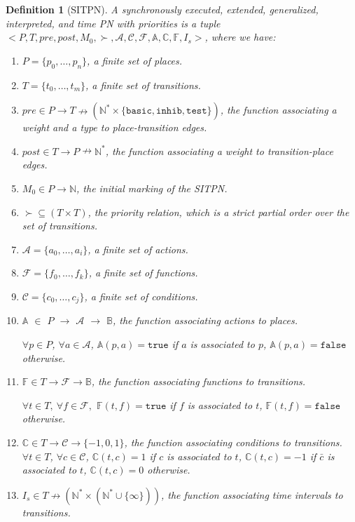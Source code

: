 \documentclass[pdflatex,sn-mathphys]{sn-jnl}%
\theoremstyle{thmstyleone}%
\theoremstyle{thmstyletwo}%
\theoremstyle{thmstylethree}%
\newtheorem{definition}{Definition}%
\begin{document}
\begin{definition}[SITPN]
  \label{def:sitpn}
  A synchronously executed, extended, generalized, interpreted, and
  time PN with priorities is a tuple
  ${<}P,T,pre,post,M_0,{\succ},\mathcal{A},\mathcal{C},\mathcal{F},
  \mathbb{A},\mathbb{C},\mathbb{F},{I_s}{>}$, where we have:
  \begin{enumerate}
  \item $P=\{p_0,\ldots,p_n\}$, a finite set of places.
  \item $T=\{t_0,\ldots,t_m\}$, a finite set of transitions.
  \item
    $pre\in{}P\rightarrow{}T\nrightarrow(\mathbb{N}^{*}\times\{\mathtt{basic},\mathtt{inhib},\mathtt{test}\})$,
    the function associating a weight and a type to place-transition
    edges.
  \item $post\in{}T\rightarrow{}P\nrightarrow\mathbb{N}^{*}$, the
    function associating a weight to transition-place edges.
  \item $M_0\in{}P\rightarrow\mathbb{N}$, the initial marking of the SITPN.
  \item $\succ\subseteq{}(T\times{}T)$, the priority relation, which
    is a strict partial order over the set of transitions.
  \item $\mathcal{A}=\{a_0,\ldots,a_i\}$, a finite set of actions.
  \item $\mathcal{F}=\{f_0,\ldots,f_k\}$, a finite set of functions.
  \item $\mathcal{C}=\{c_0,\ldots,c_j\}$, a finite set of conditions.
  \item $\mathbb{A}$ $\in$ ${}P$ $\rightarrow$ $\mathcal{A}$
    $\rightarrow$ $\mathbb{B}$, the function associating actions to
    places.

    $\forall{}p\in{}P$, $\forall{}a\in\mathcal{A}$,
    $\mathbb{A}(p,a)=\mathtt{true}$ if $a$ is associated to $p$,
    $\mathbb{A}(p,a)=\mathtt{false}$ otherwise.
    
  \item $\mathbb{F}\in{}T\rightarrow\mathcal{F}\rightarrow\mathbb{B}$,
    the function associating functions to transitions.

    $\forall{}t\in{}T,~\forall{}f\in\mathcal{F},$
    $\mathbb{F}(t,f)=\mathtt{true}$ if $f$ is associated to $t$,
    $\mathbb{F}(t,f)=\mathtt{false}$ otherwise.
    
  \item
    $\mathbb{C} \in T \rightarrow \mathcal{C} \rightarrow\{-1,0,1\}$,
    the function associating conditions to transitions.
    $\forall t \in T$, $\forall c \in \mathcal{C}$,
    $\mathbb{C}(t,c)=1$ if $c$ is associated to $t$,
    $\mathbb{C}(t,c)=-1$ if $\bar{c}$ is associated to $t$,
    $\mathbb{C}(t,c)=0$ otherwise.
    
  \item
    $I_s\in{}T\nrightarrow(\mathbb{N}^{*}\times(\mathbb{N^{*}}\cup\{\infty\}))$,
    the function associating time intervals to transitions.
  \end{enumerate}
\end{definition}
\end{document}
